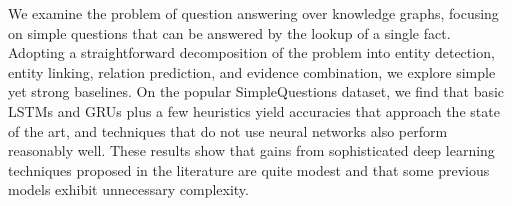We examine the problem of question answering over knowledge graphs, focusing on simple questions that can be answered by the lookup of a single fact. Adopting a straightforward decomposition of the problem into entity detection, entity linking, relation prediction, and evidence combination, we explore simple yet strong baselines. On the popular SimpleQuestions dataset, we find that basic LSTMs and GRUs plus a few heuristics yield accuracies that approach the state of the art, and techniques that do not use neural networks also perform reasonably well. These results show that gains from sophisticated deep learning techniques proposed in the literature are quite modest and that some previous models exhibit unnecessary complexity.
